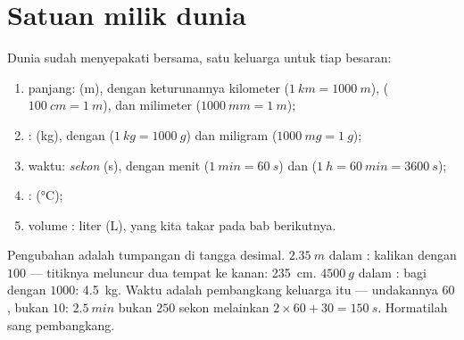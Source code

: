 \section{Satuan milik dunia}

\begin{definition}\label{def:g6:measurement-in-science:units}
Dunia sudah menyepakati  bersama, satu keluarga untuk tiap
besaran:
\begin{enumerate}
  \item panjang: \emph{} (\unit{m}), dengan keturunannya
        kilometer ($\qty{1}{km} = \qty{1000}{m}$), 
        ($\qty{100}{cm} = \qty{1}{m}$), dan milimeter
        ($\qty{1000}{mm} = \qty{1}{m}$);
  \item {}: \emph{} (\unit{kg}), dengan 
        ($\qty{1}{kg} = \qty{1000}{g}$) dan miligram
        ($\qty{1000}{mg} = \qty{1}{g}$);
  \item waktu: \emph{sekon} (\unit{s}), dengan menit
        ($\qty{1}{min} = \qty{60}{s}$) dan 
        ($\qty{1}{h} = \qty{60}{min} = \qty{3600}{s}$);
  \item {}:  (\unit{\celsius});
  \item volume : liter (\unit{L}), yang kita takar pada bab
        berikutnya.
\end{enumerate}
\end{definition}

\begin{example}\label{ex:g6:measurement-in-science:convert}
Pengubahan  adalah tumpangan di tangga desimal.
$\qty{2.35}{m}$ dalam : kalikan dengan $100$ --- titiknya
meluncur dua tempat ke kanan: \qty{235}{cm}. $\qty{4500}{g}$ dalam
: bagi dengan $1000$: \qty{4.5}{kg}. Waktu adalah pembangkang
keluarga itu --- undakannya $60$, bukan $10$: $\qty{2.5}{min}$ bukan
$250$ sekon melainkan $2 \times 60 + 30 = \qty{150}{s}$. Hormatilah
sang pembangkang.
\end{example}

